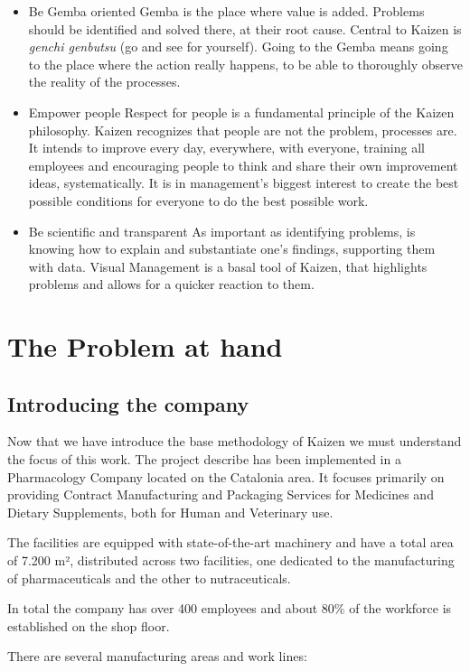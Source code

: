 \documentclass[]{article}
\begin{document}
\begin{itemize}
  \item Be Gemba oriented
    \subitem Gemba is the place where value is added. Problems should be identified and solved there, at their root cause.
    Central to Kaizen is \textit{genchi genbutsu} (go and see for yourself). Going to the Gemba means going to the place where the action really happens, to be able to thoroughly observe the reality of the processes.
  \item Empower people
    \subitem Respect for people is a fundamental principle of the Kaizen philosophy. Kaizen recognizes that people are not the problem, processes are. It intends to improve every day, everywhere, with everyone, training all employees and encouraging people to think and share their own improvement ideas, systematically. It is in management’s biggest interest to create the best possible conditions for everyone to do the best possible work.
  \item Be scientific and transparent
    \subitem As important as identifying problems, is knowing how to explain and substantiate one’s findings, supporting them with data. Visual Management is a basal tool of Kaizen, that highlights problems and allows for a quicker reaction to them.
\end{itemize}
\clearpage
\newpage

\section{The Problem at hand}
\subsection{Introducing the company}

Now that we have introduce the base methodology of Kaizen we must understand the focus of this work.
The project describe has been implemented in a Pharmacology Company located on the Catalonia area. It focuses primarily on providing Contract Manufacturing and Packaging Services for Medicines and Dietary Supplements, both for Human and Veterinary use.

The facilities are equipped with state-of-the-art machinery and have a total area of 7.200 m², distributed across two facilities, one dedicated to the manufacturing of pharmaceuticals and the other to nutraceuticals.

In total the company has over 400 employees and about 80\% of the workforce is established on the shop floor.

There are several manufacturing areas and work lines:
\end{document}

